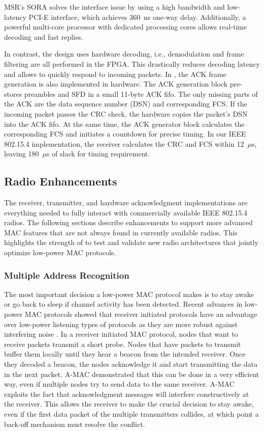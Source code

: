 MSR's SORA solves the interface issue by using a high bandwidth and
low-latency PCI-E interface, which achieves 360~ns one-way delay.
Additionally, a powerful multi-core processor with dedicated processing cores
allows real-time decoding and fast replies.

In contrast, the \sdr design uses hardware decoding, i.e., demodulation and
frame filtering are all performed in the FPGA. This drastically reduces
decoding latency and allows \sdr to quickly respond to incoming packets. In
\sdr, the ACK frame generation is also implemented in hardware. The ACK
generation block pre-stores preambles and SFD in a small 11-byte ACK fifo. The
only missing parts of the ACK are the data sequence number (DSN) and
corresponding FCS. If the incoming packet passes the CRC check, the hardware
copies the packet's DSN into the ACK fifo. At the same time, the ACK generator
block calculates the corresponding FCS and initiates a countdown for precise
timing. In our IEEE 802.15.4 implementation, the receiver calculates the CRC
and FCS within 12~$\mu$s, leaving 180~$\mu$s of slack for timing requirement.

\subsection{Radio Enhancements}
\label{subsec:enhance}

The receiver, transmitter, and hardware acknowledgment implementations are
everything needed to fully interact with commercially available IEEE 802.15.4
radios. The following sections describe enhancements to support more advanced
MAC features that are not always found in currently available radios. This
highlights the strength of \sdr to test and validate new radio architectures
that jointly optimize low-power MAC protocols.

\subsubsection{Multiple Address Recognition}

The most important decision a low-power MAC protocol makes is to stay awake or
go back to sleep if channel activity has been detected. Recent advances in
low-power MAC protocols showed that receiver initiated protocols have an
advantage over low-power listening types of protocols as they are more robust
against interfering noise \cite{2010.amac}. In a receiver initiated MAC
protocol, nodes that want to receive packets transmit a short probe. Nodes
that have packets to transmit buffer them locally until they hear a beacon
from the intended receiver. Once they decoded a beacon, the nodes acknowledge
it and start transmitting the data in the next packet. A-MAC \cite{2010.amac}
demonstrated that this can be done in a very efficient way, even if multiple
nodes try to send data to the same receiver. A-MAC exploits the fact that
acknowledgment messages will interfere constructively at the receiver. This
allows the receiver to make the crucial decision to stay awake, even if the
first data packet of the multiple transmitters collides, at which point a
back-off mechanism must resolve the conflict.

